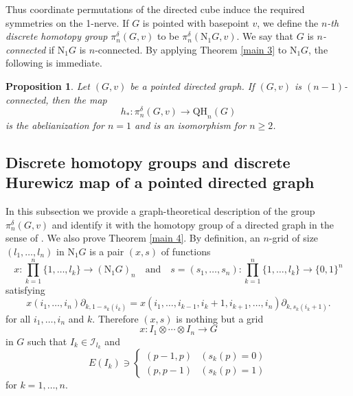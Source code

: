 \documentclass[oneside, 12pt]{amsart}
\numberwithin{equation}{section}
\theoremstyle{plain}
\newtheorem{proposition}[theorem]{Proposition}
\theoremstyle{definition}
\newtheorem{definition}[theorem]{Definition}
\theoremstyle{remark}
\begin{document}
	Thus coordinate permutations of the directed cube induce the required symmetries on the 1-nerve. If $G$ is pointed with basepoint $v$, we define the \emph{$n$-th discrete homotopy group} $\pi_n^\delta(G,v)$ to be $\pi_n^\delta(\mathrm{N}_1G,v)$. We say that $G$ is \emph{$n$-connected} if $\mathrm{N}_1G$ is $n$-connected. By applying Theorem \ref{main 3} to $\mathrm{N}_1G$, the following is immediate.
	\begin{proposition}
		\label{Hurewicz theorem discrete homotopy group of digraph}
		Let $(G,v)$ be a pointed directed graph. If $(G,v)$ is $(n-1)$-connected, then the map
		\[
		h_*\colon\pi_n^\delta(G,v)\to\mathrm{QH}_n(G)
		\]
		is the abelianization for $n=1$ and is an isomorphism for $n\ge 2$.
	\end{proposition}
	
	\subsection{Discrete homotopy groups and discrete Hurewicz map of a pointed directed graph}
	In this subsection we provide a graph-theoretical description of the group $\pi_n^\delta(G,v)$ and identify it with the homotopy group of a directed graph in the sense of \cite{LWYZ}. We also prove Theorem \ref{main 4}. By definition, an $n$-grid of size $(l_1,\ldots,l_n)$ in $\mathrm{N}_1G$ is a pair $(x,s)$ of functions
	\[
	x\colon\prod_{k=1}^n\{1,\ldots,l_k\}\to (\mathrm{N}_1G)_n\quad\text{and}\quad s=(s_1,\ldots,s_n)\colon\prod_{k=1}^n\{1,\ldots,l_k\}\to\{0,1\}^n
	\]
	satisfying
	\[
	x(i_1,\ldots,i_n)\partial_{k,1-s_k(i_k)}=x(i_1,\ldots,i_{k-1},i_k+1,i_{k+1},\ldots,i_n)\partial_{k,s_k(i_k+1)}.
	\]
	for all $i_1,\ldots,i_n$ and $k$. Therefore $(x,s)$ is nothing but a grid
	\[
	x\colon I_1\otimes\cdots\otimes I_n\to G
	\]
	in $G$ such that $I_k\in\mathcal{I}_{l_k}$ and
	\[
	E(I_k)\ni\begin{cases}
		(p-1,p)&(s_k(p)=0)\\
		(p,p-1)&(s_k(p)=1)
	\end{cases}
	\]
	for $k=1,\ldots,n$.
	
\end{document}
